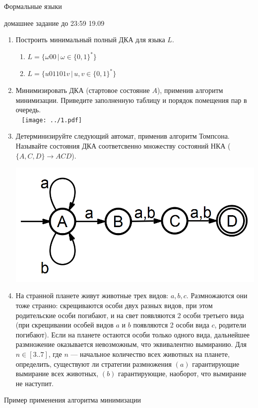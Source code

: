 \documentclass[12pt]{article}
\begin{document}
\begin{center}
  \LARGE Формальные языки 

  \Large домашнее задание до 23:59 19.09
\end{center}
\bigskip

\begin{enumerate}
  \item
  { Построить минимальный полный ДКА для языка $L$. 
    \begin{enumerate}
        \item $L = \{\omega 0 0 \, | \, \omega \in \{0,1\}^*\} $
        \item $L = \{u 01101 v \, | \, u, v \in \{0,1\}^*\} $
    \end{enumerate} 
  }
  \item Минимизировать ДКА (стартовое состояние $A$), применив алгоритм минимизации. Приведите заполненную таблицу и порядок помещения пар в очередь.
    ~\\~ \texttt{[image: ../1.pdf]} 
    \item  Детерминизируйте следующий автомат, применив алгоритм Томпсона. Называйте состояния ДКА соответсвенно множеству состояний НКА ($\{ A, C, D \} \rightarrow ACD $). 
    
        \includegraphics[width=0.5\linewidth]{2det.png}
  \item На странной планете живут животные трех видов: $a, b, c$. Размножаются они тоже странно: скрещиваются особи двух разных видов, при этом родительские особи погибают, и на свет появляются 2 особи третьего вида (при скрещивании особей видов $a$ и $b$ появляются 2 особи вида $c$, родители погибают). Если на планете остаются особи только одного вида, дальнейшее размножение оказывается невозможным, что эквивалентно вымиранию. Для $n \in [3..7]$, где $n$ --- начальное количество всех животных на планете, определить, существуют ли стратегии размножения $(a)$ гарантирующие вымирание всех животных, $(b)$ гарантирующие, наоборот, что вымирание не наступит. 
\end{enumerate}  

\newpage
\begin{center} \Large{Пример применения алгоритма минимизации}
\end{center}
\end{document}
